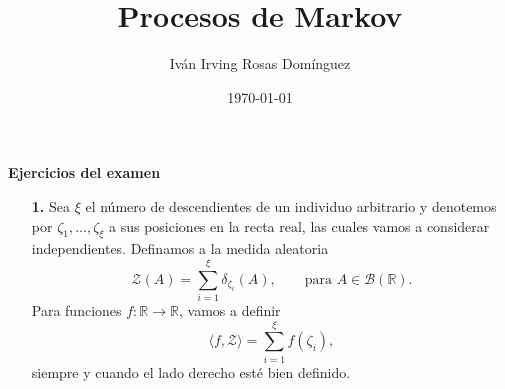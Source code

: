\documentclass[letterpaper]{article}
\title{\textbf{Procesos de Markov}}
\author{Iván Irving Rosas Domínguez}
\date{\today}
\newcommand{\R}{\mathbb{R}}
\newcommand{\B}{\mathcal{B}}
\renewcommand{\to}{\rightarrow}
\newcommand{\1}{\mathds{1}}
\theoremstyle{definition}
\theoremstyle{definition}
\theoremstyle{definition}
\theoremstyle{definition}
\theoremstyle{definition}
\begin{document}
\maketitle

\begin{center}
    \Large{\textbf{Ejercicios del examen}}
\end{center}
\begin{enumerate}
    \item[\textbf{1.}] Sea $\xi$ el número de descendientes de un individuo arbitrario y denotemos por $\zeta_1,...,\zeta_\xi$ a sus posiciones en la recta real, las cuales vamos a considerar independientes. Definamos a la medida aleatoria 
    \[
        \mathcal{Z}(A)=\sum_{i=1}^{\xi} \delta_{\zeta_i}(A), \qquad \text{para } A\in \B(\R).
    \]
    Para funciones $f:\R\to \R$, vamos a definir 
    \[
    \langle f,\mathcal{Z}\rangle=\sum_{i=1}^{\xi}f(\zeta_i),
    \]
    siempre y cuando el lado derecho esté bien definido.


\end{enumerate}
\end{document}
